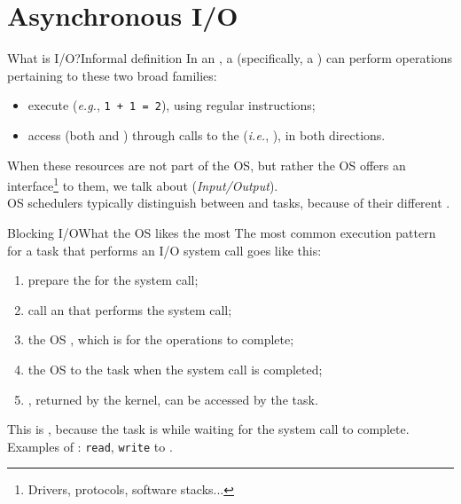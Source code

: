 
\section{Asynchronous I/O}
\graphicspath{{figs/section1/}}

\begin{frame}{What is I/O?}{Informal definition}
  In an , a  (specifically, a ) can perform operations pertaining to these two broad families:
  \begin{itemize}
    \item execute  (\emph{e.g.}, \texttt{1 + 1 = 2}), using regular  instructions;
    \item access  (both  and ) through calls to the  (\emph{i.e.}, ),  in both directions.
  \end{itemize}
  When these resources are not part of the OS, but rather the OS offers an interface\footnote{Drivers, protocols, software stacks...} to them, we talk about  (\emph{Input/Output}).\\
  \bigskip
  OS schedulers typically distinguish between  and  tasks, because of their different .
\end{frame}

\begin{frame}{Blocking I/O}{What the OS likes the most}
  The most common execution pattern for a task that performs an I/O system call goes like this:
  \begin{enumerate}
    \item prepare the  for the system call;
    \item call an  that performs the system call;
    \item the OS , which is  for the operations to complete;
    \item the OS  to the task when the system call is completed;
    \item {}, returned by the kernel, can be accessed by the task.
  \end{enumerate}
  This is , because the task is  while waiting for the system call to complete.\\
  \bigskip
  Examples of : \texttt{read}, \texttt{write} to .
\end{frame}

